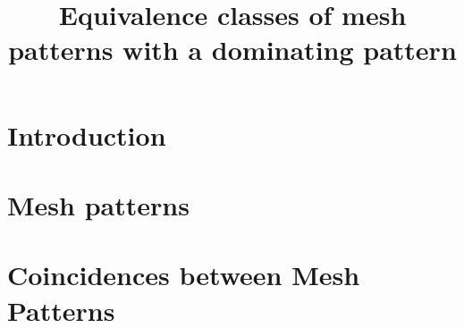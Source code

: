 \documentclass[11pt, a4paper]{amsart}
\title{Equivalence classes of mesh patterns with a dominating pattern}
\begin{document}

\maketitle
\thispagestyle{empty}
\section{Introduction}

\section{Mesh patterns}

\section{Coincidences between Mesh Patterns}

\printbibliography
\end{document}
